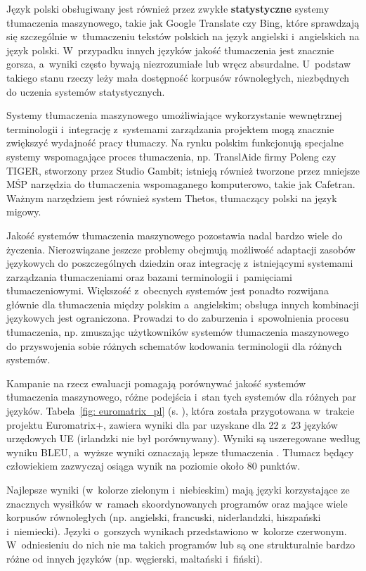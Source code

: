 \begin{multicols}{2}
Język polski obsługiwany jest również przez zwykłe
\textbf{statystyczne} systemy tłumaczenia maszynowego, takie jak
Google Translate czy Bing, które sprawdzają się szczególnie
w~tłumaczeniu tekstów polskich na język angielski i~angielskich na
język polski. W~przypadku innych języków jakość tłumaczenia jest
znacznie gorsza, a~wyniki często bywają niezrozumiałe lub wręcz
absurdalne. U~podstaw takiego stanu rzeczy leży mała dostępność
korpusów równoległych, niezbędnych do uczenia systemów
statystycznych. 

Systemy tłumaczenia maszynowego umożliwiające wykorzystanie
wewnętrznej terminologii i~integrację z~systemami zarządzania
projektem mogą znacznie zwiększyć wydajność pracy tłumaczy. Na
rynku polskim funkcjonują specjalne systemy wspomagające proces
tłumaczenia, np. TranslAide firmy Poleng czy TIGER, stworzony przez
Studio Gambit; istnieją również tworzone przez mniejsze MŚP
narzędzia do tłumaczenia wspomaganego komputerowo, takie jak
Cafetran. Ważnym narzędziem jest również system Thetos,
tłumaczący polski na język migowy. 

Jakość systemów tłumaczenia maszynowego pozostawia nadal bardzo
wiele do życzenia. Nierozwiązane jeszcze problemy obejmują
możliwość adaptacji zasobów językowych do poszczególnych
dziedzin oraz integrację z~istniejącymi systemami zarządzania
tłumaczeniami oraz bazami terminologii i~pamięciami
tłumaczeniowymi. Większość z~obecnych systemów jest ponadto
rozwijana głównie dla tłumaczenia między polskim a~angielskim;
obsługa innych kombinacji językowych jest ograniczona. Prowadzi to
do zaburzenia i~spowolnienia procesu tłumaczenia, np. zmuszając
użytkowników systemów tłumaczenia maszynowego do przyswojenia
sobie różnych schematów kodowania terminologii dla różnych
systemów. 

Kampanie na rzecz ewaluacji pomagają porównywać jakość systemów
tłumaczenia maszynowego, różne podejścia i~stan tych systemów dla
różnych par języków. Tabela~\ref{fig: euromatrix_pl} (s.
\pageref{fig: euromatrix_pl}), która została przygotowana w~trakcie
projektu Euromatrix+, zawiera wyniki dla par uzyskane dla 22 z~23
języków urzędowych UE (irlandzki nie był porównywany). Wyniki są
uszeregowane według wyniku BLEU, a~wyższe wyniki oznaczają lepsze
tłumaczenia \cite{bleu1}. Tłumacz będący człowiekiem zazwyczaj
osiąga wynik na poziomie około 80 punktów. 

Najlepsze wyniki (w~kolorze zielonym i~niebieskim) mają języki
korzystające ze znacznych wysiłków w~ramach skoordynowanych
programów oraz mające wiele korpusów równoległych (np. angielski,
francuski, niderlandzki, hiszpański i~niemiecki). Języki o~gorszych
wynikach przedstawiono w~kolorze czerwonym. W~odniesieniu do nich nie
ma takich programów lub są one strukturalnie bardzo różne od
innych języków (np. węgierski, maltański i~fiński). 


\end{multicols}
